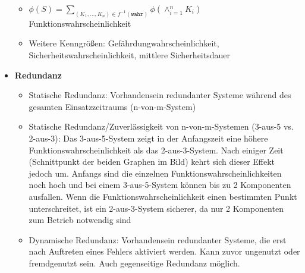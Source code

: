 \begin{itemize}
\begin{itemize}
		\item $\phi(S)=\sum_{(K_1,\dots,K_n)\in f^{-1}(\texttt{wahr})}\phi(\wedge_{i=1}^n K_i) $ Funktionswahrscheinlichkeit
		\item Weitere Kenngrößen: Gefährdungwahrscheinlichkeit, Sicherheitswahrscheinlichkeit, mittlere Sicherheitsdauer
	\end{itemize}
			\item \textbf{Redundanz}
	\begin{itemize}
		\item Statische Redundanz: Vorhandensein redundanter Systeme während des gesamten Einsatzzeitraums (n-von-m-System)
		\item Statische Redundanz/Zuverlässigkeit von n-von-m-Systemen (3-aus-5 vs. 2-aus-3): Das 3-aus-5-System zeigt in der Anfangszeit eine höhere Funktionswahrscheinlichkeit als das 2-aus-3-System. Nach einiger Zeit (Schnittpunkt der beiden Graphen im Bild) kehrt sich dieser Effekt jedoch um. Anfangs sind die einzelnen Funktionswahrscheinlichkeiten noch hoch und bei einem 3-aus-5-System können bis zu 2 Komponenten ausfallen. Wenn die Funktionswahrscheinlichkeit einen bestimmten Punkt unterschreitet, ist ein 2-aus-3-System sicherer, da nur 2 Komponenten zum Betrieb notwendig sind
		\item Dynamische Redundanz: Vorhandensein redundanter Systeme, die erst nach Auftreten eines Fehlers aktiviert werden. Kann zuvor ungenutzt oder fremdgenutzt sein. Auch gegenseitige Redundanz möglich.
	\end{itemize}
\end{itemize}


